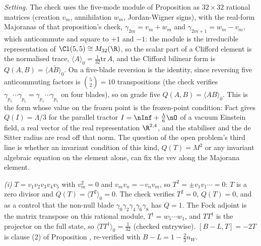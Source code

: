 \emph{Setting.} The check uses the five-mode module of Proposition  as $32 \times 32$ rational matrices (creation $v_{m}$, annihilation $w_{m}$, Jordan-Wigner signs), with the real-form Majoranas of that proposition's check, $\gamma_{2m} = v_{m} + w_{m}$ and $\gamma_{2m+1} = w_{m} - v_{m}$, which anticommute and square to $+1$ and $-1$: the module is the irreducible representation of $\Cl(5,5) \cong M_{32}(\R)$, so the scalar part of a Clifford element is the normalised trace, $\langle A\rangle_{0} = \tfrac{1}{32}\mathrm{tr}\,A$, and the Clifford bilinear form is $Q(A, B) = \langle A\tilde{B}\rangle_{0}$. On a five-blade reversion is the identity, since reversing five anticommuting factors is $\binom{5}{2} = 10$ transpositions (the check verifies $\gamma_{p_{5}}\cdots\gamma_{p_{1}} = \gamma_{p_{1}}\cdots\gamma_{p_{5}}$ on four blades), so on grade five $Q(A, B) = \langle AB\rangle_{0}$. This is the form whose value on the frozen point is the frozen-point condition: Fact  gives $Q(I) = \Lambda/3$ for the parallel tractor $I = \nInf + \tfrac{\Lambda}{6}\nO$ of a vacuum Einstein field, a real vector of the real representation $\R^{2,4}$, and the stabiliser and the de Sitter radius are read off that norm. The question of the open problem's third line is whether an invariant condition of this kind, $Q(T) = M^{2}$ or any invariant algebraic equation on the element alone, can fix the vev along the Majorana element.

\emph{(i)} $T = v_{1}v_{2}v_{3}v_{4}v_{5}$ with $v_{m}^{2} = 0$ and $v_{m}v_{n} = -v_{n}v_{m}$, so $T^{2} = \pm v_{1}v_{1}\cdots = 0$: $T$ is a zero divisor and $Q(T) = \langle T^{2}\rangle_{0} = 0$. The check verifies $T^{2} = 0$, $Q(T) = 0$, and as a control that the non-null blade $\gamma_{0}\gamma_{2}\gamma_{4}\gamma_{6}\gamma_{8}$ has $Q = 1$. The Fock adjoint is the matrix transpose on this rational module, $T^{\dagger} = w_{5}\cdots w_{1}$, and $TT^{\dagger}$ is the projector on the full state, so $\langle TT^{\dagger}\rangle_{0} = \tfrac{1}{32}$ (checked entrywise). $[B - L, T] = -2T$ is clause (2) of Proposition , re-verified with $B - L = 1 - \tfrac23 n_{W}$.


